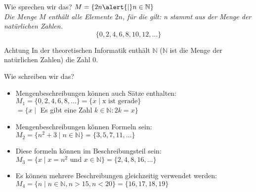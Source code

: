 %
%
%
%

\begin{frame}[fragile]{Wie sprechen wir das?}
$M = \{2n \alert{\mid} n \in \mathbb{N}\}$ \\

\emph{Die Menge $M$ enthält alle Elemente $2n$, \alert{für die gilt}: n stammt aus der Menge der natürlichen Zahlen.}
\vspace{5pt}
$$
\{0, 2, 4, 6, 8, 10, 12, \dots \}
$$

\begin{alertblock}{Achtung}
    In der theoretischen Informatik enthält $\mathbb{N}$ ($\mathbb{N}$ ist die Menge der natürlichen Zahlen) die Zahl 0.
\end{alertblock}

\end{frame}


\begin{frame}[fragile]{Wie schreiben wir das?}
    \begin{itemize}[<+- | alert@+>]
        \item Mengenbeschreibungen können auch Sätze enthalten:
        $M_1 = \{0,2,4,6,8,\dots\} = \{x \mid \text{x ist gerade}\}$\\
        \hspace{4.5mm}$= \{x \mid$ Es gibt eine Zahl $k \in \mathbb{N} : 2k = x\}$\\
        
        \item Mengenbeschreibungen können Formeln sein:
        $M_2 = \{n^2+3 \mid n \in \mathbb{N}\} = \{3, 5, 7, 11, \dots\}$
        
        \item Diese formeln können im Beschreibungsteil sein:
        $M_3 = \{x \mid x = n^2 \text{ und } x\in \mathbb{N}\} = \{2, 4, 8, 16, \dots\}$
        
        \item Es können mehrere Beschreibungen gleichzeitig verwendet werden:
        $M_4 = \{n \mid n \in \mathbb{N}, n > 15, n < 20\} = \{16, 17, 18, 19\}$\\
    
    \end{itemize}
\end{frame}

